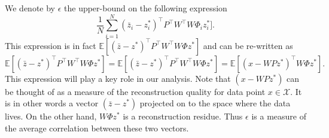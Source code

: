 \documentclass{article} %
\begin{document}
We denote by $\epsilon$ the upper-bound on the following expression
\begin{equation}
\frac{1}{N}\sum_{i=1}^N(\bar{z}_i - z^{*}_i)^{\top}P^{\top}W^{\top}W\Phi_i z^{*}_i].
\label{eq:condition}
\end{equation}
This expression is in fact $\mathbb{E}[(\bar{z} - z^{*})^{\top}P^{\top}W^{\top}W\Phi z^{*}]$ and can be re-written as
\[\mathbb{E}[(\bar{z} - z^{*})^{\top}P^{\top}W^{\top}W\Phi z^{*}] = \mathbb{E}[(\bar{z} - z^{*})^{\top}P^{\top}W^{\top}W\Phi z^{*}] = \mathbb{E}[(x - WPz^{*})^{\top}W\Phi z^{*}].
\]
This expression will play a key role in our analysis. Note that $(x - WPz^{*})$ can be thought of as a measure of the reconstruction quality for data point $x\in\mathcal{X}$. It is in other words a vector $(\bar{z} - z^{*})$ projected on to the space where the data lives. On the other hand, $W\Phi z^{*}$ is a reconstruction residue. Thus $\epsilon$ is a measure of the average correlation between these two vectors. 
\end{document}
